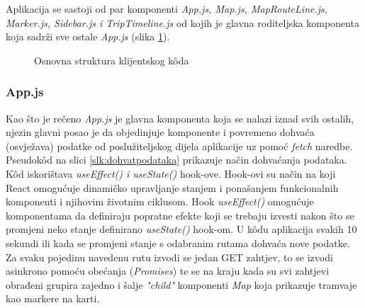 \documentclass[zavrsnirad]{fer}
\begin{document}
Aplikacija se sastoji od par komponenti \textit{App.js, Map.js, MapRouteLine.js, Marker.js, Sidebar.js i TripTimeline.js} od kojih je glavna roditeljska komponenta koja sadrži sve ostale \textit{App.js} (slika \ref{slk:strukturaklijent}).

\begin{figure}[H]
	\caption{Osnovna struktura klijentskog kôda}
	\label{slk:strukturaklijent}
\end{figure}

\subsubsection{App.js}
Kao što je rečeno \textit{App.js} je glavna komponenta koja se nalazi iznad svih ostalih, njezin glavni posao je da objedinjuje komponente i povremeno dohvaća (osvježava) podatke od poslužiteljskog dijela aplikacije uz pomoć \textit{fetch} naredbe. Pseudok\^od na slici \ref{slk:dohvatpodataka} prikazuje način dohvaćanja podataka.\\ K\^od iskorištava \textit{useEffect() i useState()} hook-ove. Hook-ovi su način na koji React omogućuje dinamičko upravljanje stanjem i ponašanjem funkcionalnih komponenti i njihovim životnim ciklusom. Hook \textit{useEffect()} omogućuje komponentama da definiraju popratne efekte koji se trebaju izvesti nakon što se promjeni neko stanje definirano \textit{useState()} hook-om. U k\^odu aplikacija svakih 10 sekundi ili kada se promjeni stanje s odabranim rutama dohvaća nove podatke. Za svaku pojedinu navedenu rutu izvodi se jedan GET zahtjev, to se izvodi asinkrono pomoću obećanja (\textit{Promises}) te se na kraju kada su svi zahtjevi obrađeni grupira zajedno i šalje \textit{"child"} komponenti \textit{Map} koja prikazuje tramvaje kao markere na karti.
\end{document}

